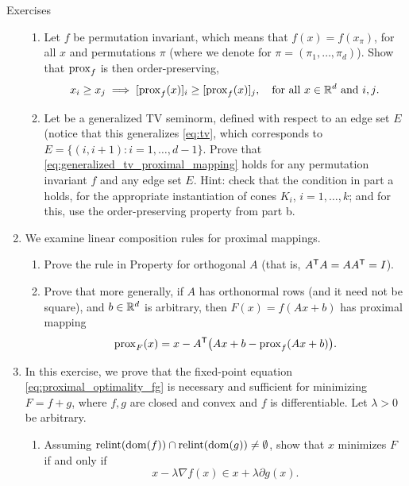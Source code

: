\begin{xcb}{Exercises}
\begin{enumerate}[label=\thechapter.\arabic*]
\begin{enumerate}[label=\alph*.]
\item Let $f$ be permutation invariant, which means that $f(x) = f(x_\pi)$, for
  all $x$ and permutations $\pi$ (where we denote  for $\pi=(\pi_1,\dots,\pi_d)$). Show that $\operatorname{prox}_f$ is
  then order-preserving,  
 \[
 x_i \geq x_j \implies [\operatorname{prox}_f(x)]_i \geq [\operatorname{prox}_f(x)]_j, \quad \text{for all
   $x \in \mathbb{R}^d$ and $i,j$}.
 \]

\item Let  be a
  generalized TV seminorm, defined with respect to an edge set $E$ (notice that  
  this generalizes \eqref{eq:tv}, which corresponds to $E = \{(i, i+1) : i =
  1,\dots,d-1\}$. Prove that \eqref{eq:generalized_tv_proximal_mapping} holds
  for any permutation invariant $f$ and any edge set $E$. Hint: check that the
  condition in part a holds, for the appropriate instantiation of cones $K_i$,
  $i=1,\dots,k$; and for this, use the order-preserving property from part b.   
\end{enumerate}

\item \label{ex:proximal_linear}
  We examine linear composition rules for proximal mappings. 

\begin{enumerate}[label=\alph*.]
\item Prove the rule in Property  for orthogonal $A$
  (that is, $A^{\mathsf{T}} A = A A^{\mathsf{T}} = I$).   

\item Prove that more generally, if $A$ has orthonormal rows (and it need not be 
  square), and $b \in \mathbb{R}^d$ is arbitrary, then $F(x) = f(Ax + b)$ has proximal
  mapping 
  \[
  \operatorname{prox}_F(x)  = x - A^{\mathsf{T}} \big(Ax + b - \operatorname{prox}_f(Ax + b) \big).
  \]
\end{enumerate}
  
\item \label{ex:proximal_optimality_fg}
  In this exercise, we prove that the fixed-point equation 
  \eqref{eq:proximal_optimality_fg} is necessary and sufficient for minimizing
  $F = f+g$, where $f,g$ are closed and convex and $f$ is differentiable. Let
  $\lambda > 0$ be arbitrary.

\begin{enumerate}[label=\alph*.]
\item Assuming $\operatorname{relint}(\operatorname{dom}(f)) \cap \operatorname{relint}(\operatorname{dom}(g)) \not= \emptyset$, show
  that $x$ minimizes $F$ if and only if  
  \[
  x - \lambda \nabla f(x) \in x + \lambda \partial g(x).
  \]
  

\end{enumerate}
\end{enumerate}
\end{xcb}
